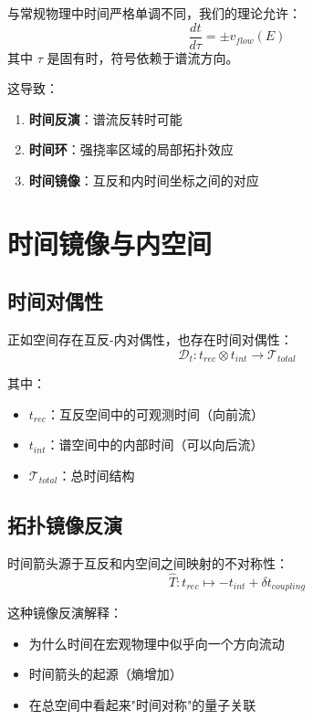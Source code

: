 与常规物理中时间严格单调不同，我们的理论允许：
\begin{equation}
    \frac{dt}{d\tau} = \pm v_{flow}(E)
\end{equation}
其中 $\tau$ 是固有时，符号依赖于谱流方向。

这导致：
\begin{enumerate}
    \item \textbf{时间反演}：谱流反转时可能
    \item \textbf{时间环}：强挠率区域的局部拓扑效应
    \item \textbf{时间镜像}：互反和内时间坐标之间的对应
\end{enumerate}

\section{时间镜像与内空间}

\subsection{时间对偶性}

正如空间存在互反-内对偶性，也存在时间对偶性：
\begin{equation}
    \mathcal{D}_t: t_{rec} \otimes t_{int} \to \mathcal{T}_{total}
\end{equation}

其中：
\begin{itemize}
    \item $t_{rec}$：互反空间中的可观测时间（向前流）
    \item $t_{int}$：谱空间中的内部时间（可以向后流）
    \item $\mathcal{T}_{total}$：总时间结构
\end{itemize}

\subsection{拓扑镜像反演}

时间箭头源于互反和内空间之间映射的不对称性：
\begin{equation}
    \hat{T}: t_{rec} \mapsto -t_{int} + \delta t_{coupling}
\end{equation}

这种镜像反演解释：
\begin{itemize}
    \item 为什么时间在宏观物理中似乎向一个方向流动
    \item 时间箭头的起源（熵增加）
    \item 在总空间中看起来"时间对称"的量子关联
\end{itemize}

